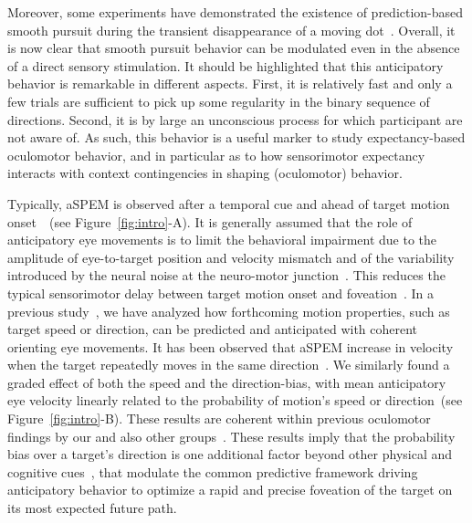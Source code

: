 \documentclass[profile,final,english, draft]{article}%
\newcommand{\citep}[1]{\parencite{#1}}
\newcommand{\seeFig}[1]{Figure~\ref{fig:#1}}
\begin{document}
Moreover, some experiments have demonstrated the existence
of prediction-based smooth pursuit during
the transient disappearance of a moving dot~\citep{Badler2006,BeckerFuchs1985}.
Overall, it is now clear that smooth pursuit behavior
can be modulated even in the absence of a direct sensory stimulation.
It should be highlighted that this anticipatory behavior is remarkable
in different aspects.
First, it is relatively fast and only a few trials are sufficient
to pick up some regularity in the binary sequence of directions.
Second, it is by large an unconscious process
for which participant are not aware of.
As such, this behavior is a useful marker
to study expectancy-based oculomotor behavior,
and in particular as to how sensorimotor expectancy interacts
with context contingencies in shaping (oculomotor) behavior.

Typically, aSPEM is observed after a temporal cue and
ahead of target motion onset~\citep{Kowler1979a,Kowler1979b, Kowler1984}~(see \seeFig{intro}-A).
It is generally assumed that the role of anticipatory eye movements is
to limit the behavioral impairment due
to the amplitude of eye-to-target position and velocity mismatch and
of the variability introduced by the neural noise
at the neuro-motor junction~\citep{WolpertXXX}.
This reduces the typical sensorimotor delay
between target motion onset and foveation~\citep{PerrinetAdamasFriston2014}.
In a previous study~\citep{Montagnini2010},
we have analyzed how forthcoming motion properties,
such as target speed or direction, can be
predicted and anticipated with coherent orienting eye movements.
It has been observed that aSPEM increase in velocity
when the target repeatedly moves in the same direction~\citep{Kowler1984, Kowler1989, Heinen2005}.
We similarly found a graded effect of both the speed and the direction-bias,
with mean anticipatory eye velocity
linearly related to the probability of motion's speed or direction~(see \seeFig{intro}-B).
These results are coherent within previous oculomotor findings
by our and also other groups~\citep{SantosKowler2017}.
These results imply that the probability bias over a target's direction is
one additional factor beyond other physical and cognitive cues~\citep{Kowler2014, SantosKowler2017},
that modulate the common predictive framework
driving anticipatory behavior to optimize a rapid and
precise foveation of the target on its most expected future path.
\end{document}
